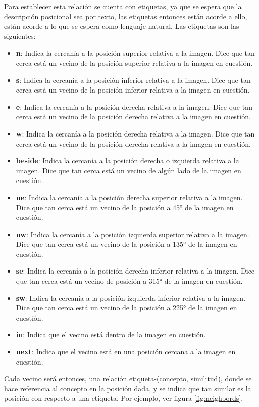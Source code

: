 Para establecer esta relación se cuenta con etiquetas, ya que se espera que la descripción posicional sea por texto, las etiquetas entonces están acorde a ello, están acorde a lo que se espera como lenguaje natural. Las etiquetas son las siguientes:
\begin{itemize}
    \item \textbf{n}: Indica la cercanía a la posición superior relativa a la imagen. Dice que tan cerca está un vecino de la posición superior relativa a la imagen en cuestión.
    \item \textbf{s}: Indica la cercanía a la posición inferior relativa a la imagen. Dice que tan cerca está un vecino de la posición inferior relativa a la imagen en cuestión.
    \item \textbf{e}: Indica la cercanía a la posición derecha relativa a la imagen. Dice que tan cerca está un vecino de la posición derecha relativa a la imagen en cuestión.
    \item \textbf{w}: Indica la cercanía a la posición derecha relativa a la imagen. Dice que tan cerca está un vecino de la posición derecha relativa a la imagen en cuestión.
    \item \textbf{beside}: Indica la cercanía a la posición derecha o izquierda relativa a la imagen. Dice que tan cerca está un vecino de alg\'un lado de la imagen en cuestión.
    \item \textbf{ne}: Indica la cercanía a la posición derecha superior relativa a la imagen. Dice que tan cerca está un vecino de la posición a 45° de la imagen en cuestión.
    \item \textbf{nw}: Indica la cercanía a la posición izquierda superior relativa a la imagen. Dice que tan cerca está un vecino de la posición a 135° de la imagen en cuestión.
    \item \textbf{se}: Indica la cercanía a la posición derecha inferior relativa a la imagen. Dice que tan cerca está un vecino de posición a 315° de la imagen en cuestión.
    \item \textbf{sw}: Indica la cercanía a la posición izquierda inferior relativa a la imagen. Dice que tan cerca está un vecino de la posición a 225° de la imagen en cuestión.
    \item \textbf{in}: Indica que el vecino está dentro de la imagen en cuestión.
    \item \textbf{next}: Indica que el vecino está en una posición cercana a la imagen en cuestión.
\end{itemize}
Cada vecino será entonces, una relación etiqueta-(concepto, similitud), donde se hace referencia al concepto en la posici\'on dada, y se indica que tan similar es la posición con respecto a una etiqueta. Por ejemplo, ver figura \ref{fig:neighbords}.


